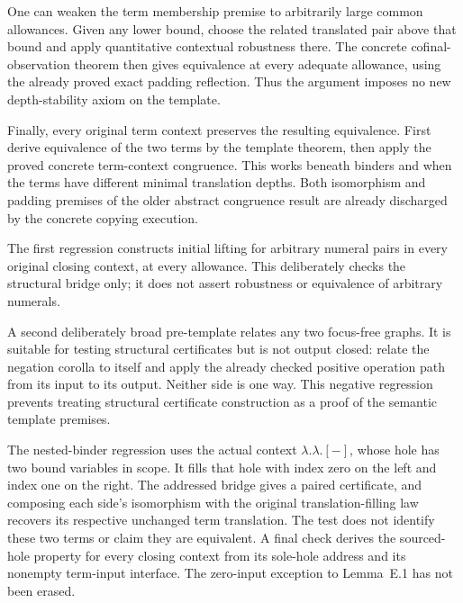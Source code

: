 
One can weaken the term membership premise to arbitrarily large common
allowances. Given any lower bound, choose the related translated pair above
that bound and apply quantitative contextual robustness there. The concrete
cofinal-observation theorem then gives equivalence at every adequate allowance,
using the already proved exact padding reflection. Thus the argument imposes
no new depth-stability axiom on the template.


Finally, every original term context preserves the resulting equivalence.
First derive equivalence of the two terms by the template theorem, then apply
the proved concrete term-context congruence. This works beneath binders and
when the terms have different minimal translation depths. Both isomorphism
and padding premises of the older abstract congruence result are already
discharged by the concrete copying execution.


The first regression constructs initial lifting for arbitrary numeral pairs
in every original closing context, at every allowance. This deliberately
checks the structural bridge only; it does not assert robustness or
equivalence of arbitrary numerals.


A second deliberately broad pre-template relates any two focus-free graphs.
It is suitable for testing structural certificates but is not output closed:
relate the negation corolla to itself and apply the already checked positive
operation path from its input to its output. Neither side is one way.
This negative regression prevents treating structural certificate construction
as a proof of the semantic template premises.


The nested-binder regression uses the actual context $\lambda.\lambda.[-]$,
whose hole has two bound variables in scope. It fills that hole with index
zero on the left and index one on the right. The addressed bridge gives a
paired certificate, and composing each side's isomorphism with the original
translation-filling law recovers its respective unchanged term translation.
The test does not identify these two terms or claim they are equivalent.
A final check derives the sourced-hole property for every closing context
from its sole-hole address and its nonempty term-input interface. The
zero-input exception to Lemma~E.1 has not been erased.


